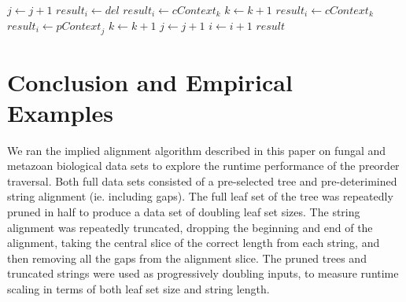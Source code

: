 \documentclass[11pt]{article}
\begin{document}
\begin{algorithm}
\begin{algorithmic}[1]
                \EndCase
              \EndSwitch
              \State $\textit{j} \gets \textit{j} + 1$
            \EndCase
                  \State $\textit{result}_i \gets \textit{del}$
                \EndCase
                  \State $\textit{result}_i \gets \textit{cContext}_k$
                  \State $\textit{k} \gets \textit{k} + 1$
                \EndCase
                    \State $\textit{result}_i \gets \textit{cContext}_k$
                  \Else
                    \State $\textit{result}_i \gets \textit{pContext}_j$
                  \EndIf
                    \State $\textit{k} \gets \textit{k} + 1$
                \EndCase
              \EndSwitch
              \State $\textit{j} \gets \textit{j} + 1$
            \EndCase
          \EndSwitch
        \EndIf  
        \State $\textit{i} \gets \textit{i} + 1$
      \EndFor
      \Return $\textit{result}$
    \EndFunction
  \end{algorithmic}
\end{algorithm}

\restoregeometry

\section{Conclusion and Empirical Examples}

We ran the implied alignment algorithm described in this paper on fungal and metazoan biological data sets to explore the runtime performance of the preorder traversal. 
Both full data sets consisted of a pre-selected tree and pre-deterimined string alignment (ie. including gaps).
The full leaf set of the tree was repeatedly pruned in half to produce a data set of doubling leaf set sizes.
The string alignment was repeatedly truncated, dropping the beginning and end of the alignment, taking the central slice of the correct length from each string, and then removing all the gaps from the alignment slice.
The pruned trees and truncated strings were used as progressively doubling inputs, to measure runtime scaling in terms of both leaf set size and string length.
\end{document}

